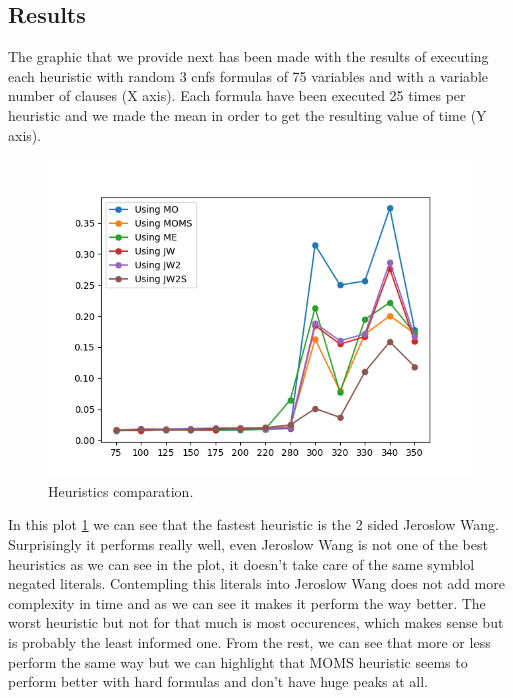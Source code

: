 \documentclass{article}
\begin{document}
\subsection{Results}
The graphic that we provide next has been made with the results of executing each heuristic with random 3 cnfs formulas of 75 variables and with a variable number of clauses (X axis). Each formula have been executed 25 times per heuristic and we made the mean in order to get the resulting value of time (Y axis).   
\begin{figure}[H]
  \includegraphics[width=\linewidth]{../utils/plots/heuristics.png}
  \caption{Heuristics comparation.}
  \label{fig:heu}
\end{figure}
In this plot \ref{fig:heu} we can see that the fastest heuristic is the 2 sided Jeroslow Wang. Surprisingly it performs really well, even Jeroslow Wang is not one of the best heuristics as we can see in the plot, it doesn't take care of the same symblol negated literals. Contempling this literals into Jeroslow Wang does not add more complexity in time and as we can see it makes it perform the way better.
The worst heuristic but not for that much is most occurences, which makes sense but is probably the least informed one. 
From the rest, we can see that more or less perform the same way but we can highlight that MOMS heuristic seems to perform better with hard formulas and don't have huge peaks at all.
\end{document}
